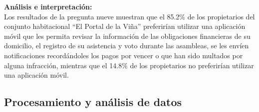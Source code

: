 \textbf{Análisis e interpretación:}\\
Los resultados de la pregunta nueve muestran que el 85.2\% de los propietarios del conjunto habitacional {\textquotedblleft}El Portal de la Viña{\textquotedblright} preferirían utilizar una aplicación móvil que les permita revisar la información de las obligaciones financieras de su domicilio, el registro de su asistencia y voto durante las asambleas, se les envíen notificaciones recordándoles los pagos por vencer o que han sido multados por alguna infracción, mientras que el 14.8\% de los propietarios no preferirían utilizar una aplicación móvil.


\subsection{Procesamiento y análisis de datos}\label{subsec:procesamiento-y-analisis-de-datos}

